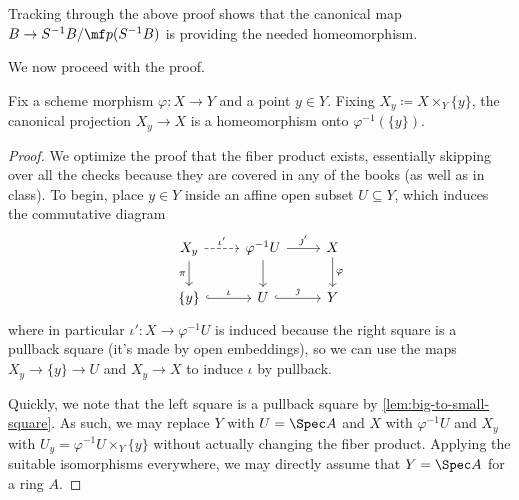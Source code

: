 \documentclass[../notes.tex]{subfiles}
\begin{document}
\begin{remark}
	Tracking through the above proof shows that the canonical map $B\to S^{-1}B/\mf p(S^{-1}B)$ is providing the needed homeomorphism.
\end{remark}
We now proceed with the proof.
\begin{lemma} \label{lem:topological-fiber}
	Fix a scheme morphism $\varphi\colon X\to Y$ and a point $y\in Y$. Fixing $X_y\coloneqq X\times_Y\{y\}$, the canonical projection $X_y\to X$ is a homeomorphism onto $\varphi^{-1}(\{y\})$.
\end{lemma}
\begin{proof}
	We optimize the proof that the fiber product exists, essentially skipping over all the checks because they are covered in any of the books (as well as in class). To begin, place $y\in Y$ inside an affine open subset $U\subseteq Y$, which induces the commutative diagram
	\[\begin{tikzcd}
		{X_y} & {\varphi^{-1}U} & X \\
		{\{y\}} & U & Y
		\arrow["\varphi", from=1-3, to=2-3]
		\arrow["\jmath", hook, from=2-2, to=2-3]
		\arrow["{\jmath'}", from=1-2, to=1-3]
		\arrow["\iota", hook, from=2-1, to=2-2]
		\arrow["{\pi}"', from=1-1, to=2-1]
		\arrow[from=1-2, to=2-2]
		\arrow["{\iota'}", dashed, from=1-1, to=1-2]
	\end{tikzcd}\]
	where in particular $\iota'\colon X\to\varphi^{-1}U$ is induced because the right square is a pullback square (it's made by open embeddings), so we can use the maps $X_y\to\{y\}\to U$ and $X_y\to X$ to induce $\iota$ by pullback.

	Quickly, we note that the left square is a pullback square by \autoref{lem:big-to-small-square}. As such, we may {replace $Y$ with $U=\Spec A$ and $X$ with $\varphi^{-1}U$ and $X_y$ with $U_y=\varphi^{-1}U\times_Y\{y\}$} without actually changing the fiber product. Applying the suitable isomorphisms everywhere, we may directly assume that $Y=\Spec A$ for a ring $A$.


\end{proof}
\end{document}
